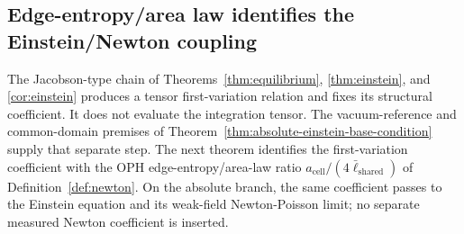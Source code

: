 \documentclass[11pt]{article}
\begin{document}
\subsection{Edge-entropy/area law identifies the Einstein/Newton coupling}\label{subsec:edge-entropy-newton-coupling}

The Jacobson-type chain of Theorems~\ref{thm:equilibrium},
\ref{thm:einstein}, and \ref{cor:einstein} produces a tensor
first-variation relation and fixes its structural coefficient. It does not
evaluate the integration tensor. The vacuum-reference and common-domain
premises of Theorem~\ref{thm:absolute-einstein-base-condition} supply that
separate step. The next theorem identifies the first-variation coefficient
with the OPH edge-entropy/area-law ratio
\(a_{\mathrm{cell}}/(4\bar\ell_{\mathrm{shared}})\) of
Definition~\ref{def:newton}. On the absolute branch, the same coefficient
passes to the Einstein equation and its weak-field Newton-Poisson limit; no
separate measured Newton coefficient is inserted.
\end{document}
